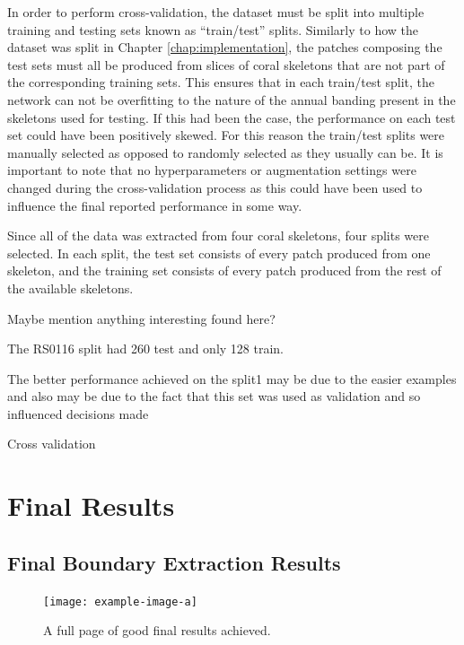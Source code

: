 In order to perform cross-validation, the dataset must be split into multiple training and testing sets known as ``train/test'' splits. Similarly to how the dataset was split in Chapter \ref{chap:implementation}, the patches composing the test sets must all be produced from slices of coral skeletons that are not part of the corresponding training sets. This ensures that in each train/test split, the network can not be overfitting to the nature of the annual banding present in the skeletons used for testing. If this had been the case, the performance on each test set could have been positively skewed. For this reason the train/test splits were manually selected as opposed to randomly selected as they usually can be. It is important to note that no hyperparameters or augmentation settings were changed during the cross-validation process as this could have been used to influence the final reported performance in some way.

Since all of the data was extracted from four coral skeletons, four splits were selected. In each split, the test set consists of every patch produced from one skeleton, and the training set consists of every patch produced from the rest of the available skeletons.


Maybe mention anything interesting found here?

The RS0116 split had 260 test and only 128 train.

The better performance achieved on the split1 may be due to the easier examples and also may be due to the fact that this set was used as validation and so influenced decisions made

\begin{table}[!t]
    \centering
    \caption{Cross validation}
    
    \label{tab:crossval}
\end{table}

\section{Final Results}
\label{sec:finalresults}

\subsection{Final Boundary Extraction Results}

\begin{figure}[!p]
    \centering
    \texttt{[image: example-image-a]}
    \caption{A full page of good final results achieved.}
    \label{fig:finalresultsgood}
\end{figure}

